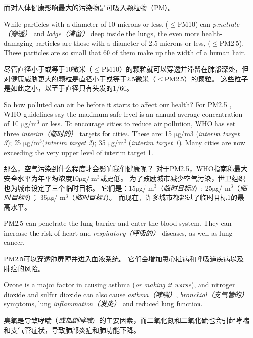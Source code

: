 \begin{multicols}{3}
\begin{enumerate}
\end{enumerate}

而对人体健康影响最大的污染物是可吸入颗粒物（PM）。

While particles with a diameter of 10 microns or less, ($\leq$PM10) can \textit{penetrate（穿透）} and \textit{lodge（滞留）} deep inside the lungs, the even more health-damaging particles are those with a diameter of 2.5 microns or less, ($\leq$PM2.5). These particles are so small that 60 of them make up the width of a human hair.

尽管直径小于或等于10微米（$\leq$PM10）的颗粒就可以穿透并滞留在肺部深处，但对健康威胁更大的颗粒是直径小于或等于2.5微米（$\leq$PM2.5）的颗粒。 这些粒子是如此之小，以至于直径只有头发的1/60。

So how polluted can air be before it starts to affect our health? For PM2.5 , WHO guidelines say the maximum safe level is an annual average concentration of 10 $\mathrm{\mu}$g/m$^3$ or less. To encourage cities to reduce air pollution, WHO has set three \textit{interim（临时的）} targets for cities. These are: 15 $\mathrm{\mu}$g/m3 (\textit{interim target 3}); 25 $\mathrm{\mu}$g/m$^3$(\textit{interim target 2}); 35 $\mathrm{\mu}$g/m$^3$ (\textit{interim target 1}). Many cities are now exceeding the very upper level of interim target 1.

那么，空气污染到什么程度才会影响我们健康呢？ 对于PM2.5，WHO指南称最大安全水平为年平均浓度10$\mathrm{\mu}$g/ m$^3$或更低。 为了鼓励城市减少空气污染，世卫组织也为城市设定了三个临时目标。 它们是：15$\mathrm{\mu}$g/ m$^3$（\textit{临时目标3}）; 25$\mathrm{\mu}$g/ m$^3$（\textit{临时目标2}）； 35$\mathrm{\mu}$g/ m$^3$（\textit{临时目标1}）。 而现在，许多城市都超过了临时目标1的最高水平。

PM2.5 can penetrate the lung barrier and enter the blood system. They can increase the risk of heart and \textit{respiratory（呼吸的）} diseases, as well as lung cancer.

PM2.5可以穿透肺屏障并进入血液系统。 它们会增加患心脏病和呼吸道疾病以及肺癌的风险。

Ozone is a major factor in causing asthma (\textit{or making it worse}), and nitrogen dioxide and sulfur dioxide can also cause \textit{asthma（哮喘）}, \textit{bronchial（支气管的）} symptoms, lung \textit{inflammation（发炎）} and reduced lung function. 

臭氧是导致哮喘（\textit{或加剧哮喘}）的主要因素，而二氧化氮和二氧化硫也会引起哮喘和支气管症状，导致肺部炎症和肺功能下降。 


\end{multicols}

